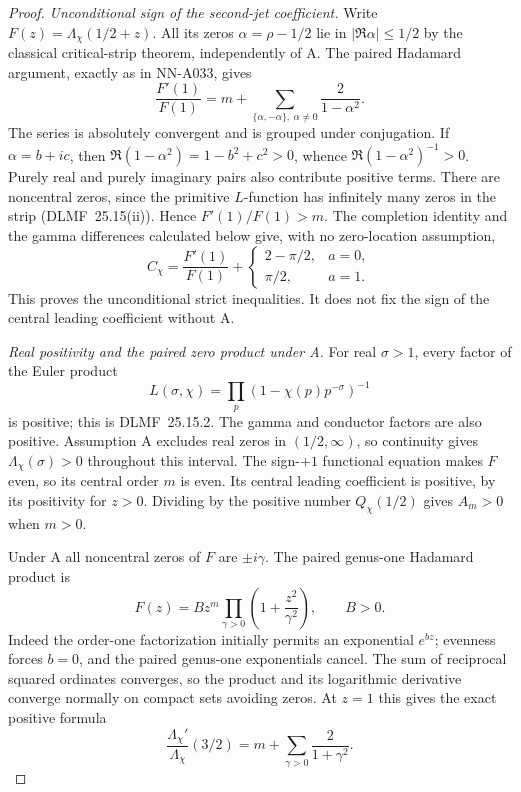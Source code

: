 \begin{proof}
\emph{Unconditional sign of the second-jet coefficient.}
Write $F(z)=\Lambda_\chi(1/2+z)$. All its zeros
$\alpha=\rho-1/2$ lie in $|\Re\alpha|\le1/2$ by the classical
critical-strip theorem, independently of A. The paired
Hadamard argument, exactly as in NN-A033, gives
\[
 \frac{F'(1)}{F(1)}
       =m+\sum_{\{\alpha,-\alpha\},\ \alpha\ne0}
                         \frac2{1-\alpha^2}.
\]
The series is absolutely convergent and is grouped under
conjugation. If $\alpha=b+ic$, then
$\Re(1-\alpha^2)=1-b^2+c^2>0$, whence
$\Re(1-\alpha^2)^{-1}>0$. Purely real and purely imaginary
pairs also contribute positive terms. There are noncentral
zeros, since the primitive $L$-function has infinitely many
zeros in the strip (DLMF~25.15(ii)). Hence $F'(1)/F(1)>m$.
The completion identity and the gamma differences calculated
below give, with no zero-location assumption,
\[
 C_\chi=\frac{F'(1)}{F(1)}+
       \begin{cases}2-\pi/2,&a=0,\\ \pi/2,&a=1.
       \end{cases}
\]
This proves the unconditional strict inequalities. It does not
fix the sign of the central leading coefficient without A.

\emph{Real positivity and the paired zero product under A.}
For real $\sigma>1$, every factor of the Euler product
\[
            L(\sigma,\chi)=\prod_p(1-\chi(p)p^{-\sigma})^{-1}
\]
is positive; this is DLMF~25.15.2. The gamma and conductor
factors are also positive. Assumption A excludes real zeros in
$(1/2,\infty)$, so continuity gives
$\Lambda_\chi(\sigma)>0$ throughout this interval. The
sign-$+1$ functional equation
makes $F$ even, so its central order $m$ is even. Its central
leading coefficient is positive, by its positivity for $z>0$.
Dividing by the positive number $Q_\chi(1/2)$ gives $A_m>0$
when $m>0$.

Under A all noncentral zeros of $F$ are $\pm i\gamma$. The
paired genus-one Hadamard product is
\begin{equation}\label{eq:analytic-dirichlet-positive-product}
 F(z)=Bz^m\prod_{\gamma>0}\left(1+\frac{z^2}{\gamma^2}\right),
                         \qquad B>0.
\end{equation}
Indeed the order-one factorization initially permits an
exponential $e^{b z}$; evenness forces $b=0$, and the paired
genus-one exponentials cancel. The sum of reciprocal squared
ordinates converges, so the product and its logarithmic
derivative converge normally on compact sets avoiding zeros.
At $z=1$ this gives the exact positive formula
\begin{equation}\label{eq:analytic-dirichlet-log-derivative}
       \frac{\Lambda_\chi'}{\Lambda_\chi}(3/2)
                    =m+\sum_{\gamma>0}\frac2{1+\gamma^2}.
\end{equation}


\end{proof}
